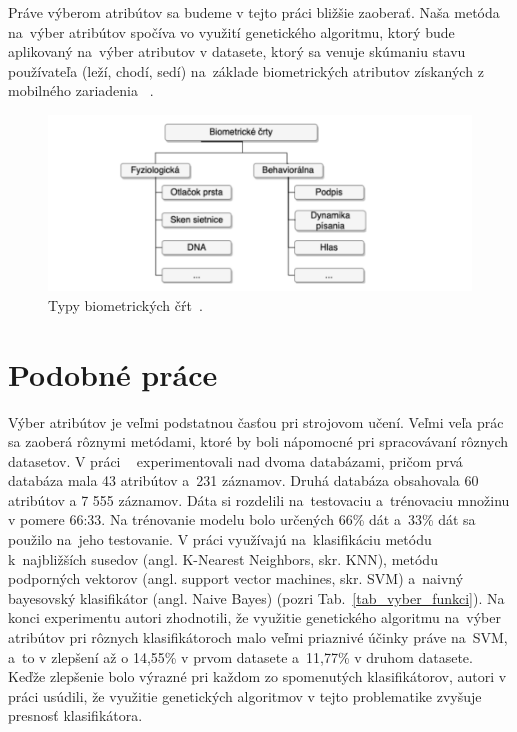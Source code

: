 \documentclass[runningheads]{llncs}
\begin{document}
Práve výberom atribútov sa 
budeme v tejto práci bližšie zaoberať. Naša metóda na~výber atribútov spočíva vo využití 
genetického algoritmu, ktorý bude aplikovaný na~výber atributov v datasete, ktorý sa venuje skúmaniu
stavu používateľa (leží, chodí, sedí) na~základe biometrických atributov získaných z~
mobilného zariadenia ~\cite{ref_dataset_anguita,ref_dataset}.


\begin{figure}
\includegraphics[width=\textwidth]{image/rozdelenie_biometrie.png}
\caption{Typy biometrických čŕt~\cite{ref_teh}.} \label{fig_rozdelenie_biometrie}
\end{figure}

\section{Podobné práce}

Výber atribútov je veľmi podstatnou časťou pri strojovom učení. Veľmi veľa prác sa 
zaoberá rôznymi metódami, ktoré by boli nápomocné pri spracovávaní rôznych datasetov.
V práci ~\cite{ref_nascimento} experimentovali nad dvoma databázami, pričom 
prvá databáza mala 43 atribútov a~231 záznamov. Druhá databáza obsahovala 60 atribútov 
a 7 555 záznamov. Dáta si rozdelili na~testovaciu a~trénovaciu množinu v pomere 66:33. 
Na trénovanie modelu bolo určených 66\% dát a~33\% dát sa použilo na~jeho testovanie. 
V práci využívajú na~klasifikáciu metódu k~najbližších susedov (angl. K-Nearest Neighbors, skr. KNN), metódu podporných vektorov (angl. support vector machines, skr. SVM) a~naivný bayesovský klasifikátor (angl. Naive Bayes)  
(pozri Tab.~\ref{tab_vyber_funkci}). Na konci experimentu autori zhodnotili, 
že využitie genetického algoritmu na~výber atribútov pri rôznych klasifikátoroch malo veľmi priaznivé
účinky práve na~SVM, a~to v zlepšení až o 14,55\% v prvom datasete a~11,77\% v druhom datasete.
Keďže zlepšenie bolo výrazné pri každom zo spomenutých klasifikátorov, autori v práci usúdili, že
využitie genetických algoritmov v tejto problematike zvyšuje presnosť klasifikátora.
\end{document}
